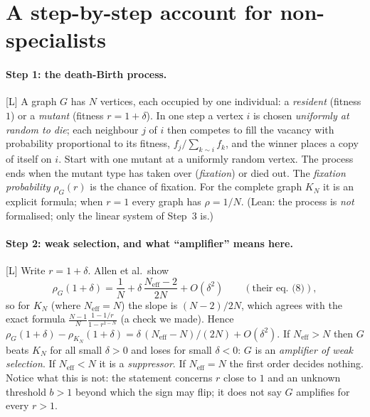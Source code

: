 \documentclass[10pt]{article}
\newcommand{\tier}[1]{\textsf{[#1]}}
\newcommand{\tL}{\tier{L}}
\newcommand{\Neff}{N_{\mathrm{eff}}}
\begin{document}
\section{A step-by-step account for non-specialists}\label{sec:human}
\paragraph{Step 1: the death-Birth process.}\tL{} A graph $G$ has $N$ vertices, each occupied by one individual: a \emph{resident}
(fitness $1$) or a \emph{mutant} (fitness $r=1+\delta$). In one step a vertex $i$ is chosen \emph{uniformly at random to die}; each
neighbour $j$ of $i$ then competes to fill the vacancy with probability proportional to its fitness, $f_j/\sum_{k\sim i}f_k$, and the
winner places a copy of itself on $i$. Start with one mutant at a uniformly random vertex. The process ends when the mutant type has
taken over (\emph{fixation}) or died out. The \emph{fixation probability} $\rho_G(r)$ is the chance of fixation. For the complete graph
$K_N$ it is an explicit formula; when $r=1$ every graph has $\rho=1/N$. (Lean: the process is \emph{not} formalised; only the linear
system of Step~3 is.)

\paragraph{Step 2: weak selection, and what ``amplifier'' means here.}\tL{} Write $r=1+\delta$. Allen et al.\ show
\begin{equation}\label{eq:expansion}
\rho_G(1+\delta)=\frac1N+\delta\,\frac{\Neff-2}{2N}+O(\delta^2)\qquad(\text{their eq.~(8)}),
\end{equation}
so for $K_N$ (where $\Neff=N$) the slope is $(N-2)/2N$, which agrees with the exact formula $\tfrac{N-1}{N}\tfrac{1-1/r}{1-r^{1-N}}$
(a check we made). Hence $\rho_G(1+\delta)-\rho_{K_N}(1+\delta)=\delta\,(\Neff-N)/(2N)+O(\delta^2)$. If $\Neff>N$ then $G$ beats $K_N$ for all small
$\delta>0$ and loses for small $\delta<0$: $G$ is an \emph{amplifier of weak selection}. If $\Neff<N$ it is a \emph{suppressor}. If
$\Neff=N$ the first order decides nothing. Notice what this is not: the statement concerns $r$ close to $1$ and an unknown threshold
$b>1$ beyond which the sign may flip; it does not say $G$ amplifies for every $r>1$.
\end{document}
